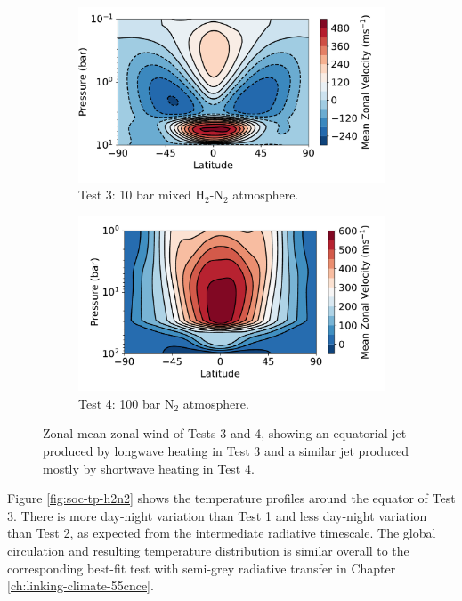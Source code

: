 \begin{figure}
  \centering
  \begin{subfigure}[t]{0.48\textwidth}
    \includegraphics[width=\textwidth]{figures/soc-lava-planets/h2n2-soc-zonal-u.pdf}
    \caption{Test 3: 10 bar mixed H$_{2}$-N$_{2}$ atmosphere.}\label{fig:soc-zonal-u-h2n2}
  \end{subfigure}
\quad
  \begin{subfigure}[t]{0.48\textwidth}
    \includegraphics[width=\textwidth]{figures/soc-lava-planets/n2-100bar-soc-zonal-u.pdf}
    \caption{Test 4: 100 bar N$_{2}$ atmosphere.}\label{fig:soc-zonal-u-n2-100bar}
  \end{subfigure}
    \caption{Zonal-mean zonal wind of Tests 3 and 4, showing an equatorial jet produced by longwave heating in Test 3 and a similar jet produced mostly by shortwave heating in Test 4.}
  \label{fig:soc-zonal-wind-best}
\end{figure}

Figure \ref{fig:soc-tp-h2n2} shows the temperature profiles around the equator of Test 3. There is more day-night variation than Test 1 and less day-night variation than Test 2, as expected from the intermediate radiative timescale. The global circulation and resulting temperature distribution is similar overall to the corresponding best-fit test with semi-grey radiative transfer in Chapter \ref{ch:linking-climate-55cnce}.

